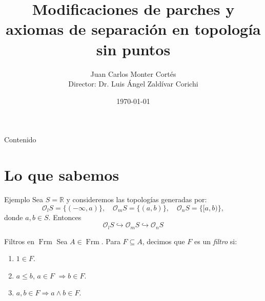 \documentclass[compress,12pt]{beamer}
\title{Modificaciones de parches y axiomas de separación en topología sin puntos}
\date{\today}
\author{Juan Carlos Monter Cortés \\ Director: Dr. Luis Ángel Zaldívar Corichi}
\institute{Universidad de Guadalajara}
\DeclareMathOperator{\Frm}{Frm}
\begin{document}
\frame[plain]{\titlepage}

\begin{frame}{Contenido}
\tableofcontents %
\end{frame}

\section{Lo que sabemos}

\begin{frame}[fragile]{Ejemplo}
Sea $S=\mathbb{R}$ y consideremos las topologías generadas por:
\[
\mathcal{O}_lS=\{(-\infty, a)\},\quad  \mathcal{O}_mS=\{(a,b)\}, \quad \mathcal{O}_nS=\{[a,b)\},
\]
donde $a,b\in S$. Entonces
\[
\mathcal{O}_lS \hookrightarrow \mathcal{O}_mS \hookrightarrow \mathcal{O}_nS
\]

\end{frame}

\begin{frame}{Filtros en $\Frm$}
    Sea $A\in \Frm$. Para $F\subseteq A$, decimos que $F$ es un \emph{filtro} si:
		\begin{enumerate}
			\item $1\in F$.
			\item $a\leq b$, $a\in  F$ $\Rightarrow b \in F$.
			\item $a, b \in F \Rightarrow  a \wedge b \in F$.
		\end{enumerate}
\end{frame}
\end{document}

